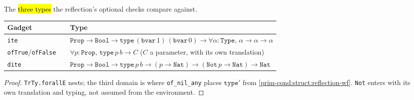 \begin{lemma}
  \label{prim-cond:family:refl-check-types}
  \leanok

   The \hl{three types} the reflection's optional checks compare against.
  \begin{center}
  \par\smallskip\noindent
\begin{tabular}{lp{0.77\linewidth}}
  \toprule
  Gadget & Type \\
  \midrule
  \texttt{ite} & $\mathtt{Prop} \to \mathtt{Bool} \to \mathtt{type}\,(\mathtt{bvar}\,1)\,(\mathtt{bvar}\,0) \to \forall \alpha : \mathtt{Type},\,\alpha \to \alpha \to \alpha$ \\
  \texttt{ofTrue}/\texttt{ofFalse} & $\forall p : \mathtt{Prop},\,\mathtt{type}\,p\,b \to C$ ($C$ a
    parameter, with its own translation) \\
  \texttt{dite} & $\mathtt{Prop} \to \mathtt{Bool} \to \mathtt{type}\,p\,b \to (p \to \mathtt{Nat})
    \to (\mathtt{Not}\,p \to \mathtt{Nat}) \to \mathtt{Nat}$ \\
  \bottomrule
  \end{tabular}\par\smallskip
  \end{center}
\end{lemma}
\begin{proof}
  \leanok
   \texttt{TrTy.forallE} nests; the third domain is where \texttt{of\_nil\_any} places
  $\mathtt{type}'$ from \ref{prim-cond:struct:reflection-wf}. \texttt{Not} enters with its own
  translation and typing, not assumed from the environment.
\end{proof}

